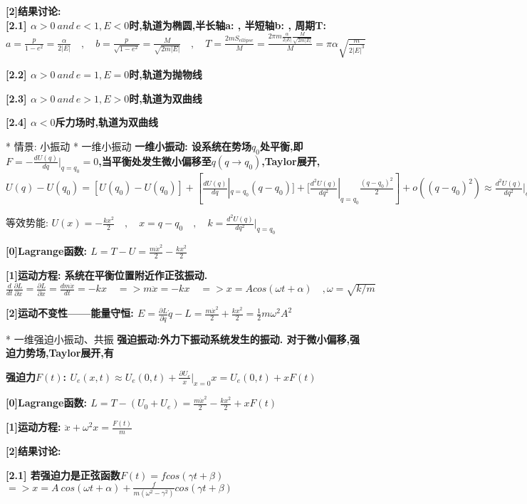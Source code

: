 		\bf{[2]结果讨论}: \\
		
		\bf{[2.1] $\alpha > 0\ and\ e<1, E<0$时,轨道为椭圆}\quad,半长轴a: \quad , 半短轴b: \quad , 周期T:
		$a = \frac{p}{1-e^2} = \frac{\alpha}{2|E|} \quad , \quad b = \frac{p}{\sqrt{1-e^2}} = \frac{M}{\sqrt{2m|E|}} \quad , \quad T = \frac{2mS_{ellipse}}{M} = \frac{2π m \frac{\alpha}{2|E|} \frac{M}{\sqrt{2m|E|}}}{M} = π \alpha \sqrt{\frac{m}{2|E|^3}} $
		
		\bf{[2.2] $\alpha > 0\ and\ e=1, E=0$时,轨道为抛物线}
		
		\bf{[2.3] $\alpha > 0\ and\ e>1, E>0$时,轨道为双曲线}
		
		\bf{[2.4] $\alpha < 0$斥力场时,轨道为双曲线}

	* 情景: 小振动
		* 一维小振动
			\bf{一维小振动}:
				设系统在势场$q_0$处平衡,即$F = -\frac{dU(q)}{dq}|_{q=q_0} = 0$,当平衡处发生微小偏移至$q(q\to q_0)$,Taylor展开,
				$U(q) - U(q_0) = [U(q_0) - U(q_0)] + [\frac{d U(q)}{dq}|_{q=q_0} (q - q_0)]+ [\frac{d^2 U(q)}{dq^2}|_{q=q_0} \frac{(q - q_0)^2}{2}] + o((q - q_0)^2) \approx \frac{d^2 U(q)}{dq^2}|_{q=q_0} \frac{(q - q_0)^2}{2}$
			
			等效势能:
			$U(x) = - \frac{k x^2}{2} \quad , \quad x = q-q_0 \quad ,\quad k = \frac{d^2 U(q)}{dq^2}|_{q=q_0}$
			
			\bf{[0]Lagrange函数}:
			$L = T - U = \frac{m \dot x^2}{2} - \frac{k x^2}{2}$
			
			\bf{[1]运动方程}: 系统在平衡位置附近作正弦振动.
			$\frac{d}{dt} \frac{∂ L}{∂ \dot x} = \frac{∂ L}{∂ x} = \frac{d m\dot x}{dt} = -kx \quad => m \ddot x = -kx \quad => x = A cos(\omega t + \alpha) \quad , \omega = \sqrt{k/m}$
			
			\bf{[2]运动不变性——能量守恒}:
			$E = \frac{∂ L}{∂ \dot q}\dot q - L = \frac{m \dot x^2}{2} + \frac{k x^2}{2} = \frac{1}{2} m \omega^2 A^2$

		* 一维强迫小振动、共振
			\bf{强迫振动}:外力下振动系统发生的振动. 对于微小偏移,强迫力势场,Taylor展开,有
			
			\bf{强迫力$F(t)$}:
				$U_e(x,t) \approx U_e(0,t) + \frac{∂ U_e}{x}|_{x=0}x = U_e(0,t) + xF(t)$
			
			\bf{[0]Lagrange函数}:
				$L = T - (U_0 + U_e) = \frac{m \dot x^2}{2} - \frac{k x^2}{2} + xF(t)$
			
			\bf{[1]运动方程}:
				$\ddot x + \omega^2 x = \frac{F(t)}{m}$
			
			\bf{[2]结果讨论}:
			
			\bf{[2.1]} 若强迫力是正弦函数$F(t) = f cos(\gamma t + \beta)$
				$ => x = A\ cos(\omega t + \alpha) + \frac{f}{m(\omega^2 - \gamma^2)} cos(\gamma t + \beta)$
				
